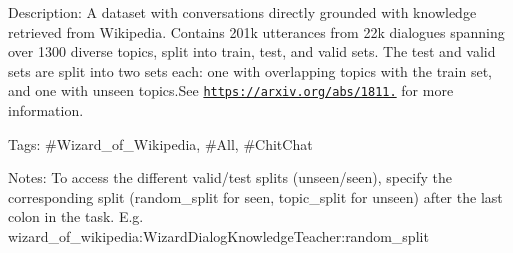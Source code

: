 Description\+: A dataset with conversations directly grounded with knowledge retrieved from Wikipedia. Contains 201k utterances from 22k dialogues spanning over 1300 diverse topics, split into train, test, and valid sets. The test and valid sets are split into two sets each\+: one with overlapping topics with the train set, and one with unseen topics.\+See \href{https://arxiv.org/abs/1811.01241}{\tt https\+://arxiv.\+org/abs/1811.} for more information.

Tags\+: \#\+Wizard\+\_\+of\+\_\+\+Wikipedia, \#\+All, \#\+Chit\+Chat

Notes\+: To access the different valid/test splits (unseen/seen), specify the corresponding split ({\ttfamily random\+\_\+split} for seen, {\ttfamily topic\+\_\+split} for unseen) after the last colon in the task. E.\+g. {\ttfamily wizard\+\_\+of\+\_\+wikipedia\+:\+Wizard\+Dialog\+Knowledge\+Teacher\+:random\+\_\+split} 